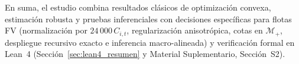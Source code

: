 En suma, el estudio combina resultados clásicos de optimización convexa, estimación robusta y pruebas inferenciales con decisiones específicas para flotas FV (normalización por $24\,000\,C_{i,t}$, regularización anisotrópica, cotas en $\mathcal{M}_+$, despliegue recursivo exacto e inferencia macro-alineada) y verificación formal en Lean~4 \cite{moura2021lean4,mathlib2020} (Sección~\ref{sec:lean4_resumen} y Material Suplementario, Sección~S2).
